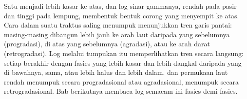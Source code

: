 Satu  menjadi lebih kasar ke atas, dan log sinar gammanya, rendah pada pasir
dan tinggi pada lempung, membentuk bentuk corong yang menyempit ke atas. Cara
 dalam suatu traktus saling menumpuk menunjukkan tren garis pantai:
masing-masing dibangun lebih jauh ke arah laut daripada yang sebelumnya (progradasi),
di atas yang sebelumnya (agradasi), atau ke arah darat (retrogradasi). Log
melalui tumpukan itu memperlihatkan tren secara langsung: setiap  berakhir
dengan fasies yang lebih kasar dan lebih dangkal daripada yang di bawahnya, sama, atau lebih halus dan lebih dalam.
 dan permukaan laut rendah menumpuk secara progradasional atau agradasional,
 menumpuk secara retrogradasional. Bab berikutnya membaca
log semacam ini fasies demi fasies.

